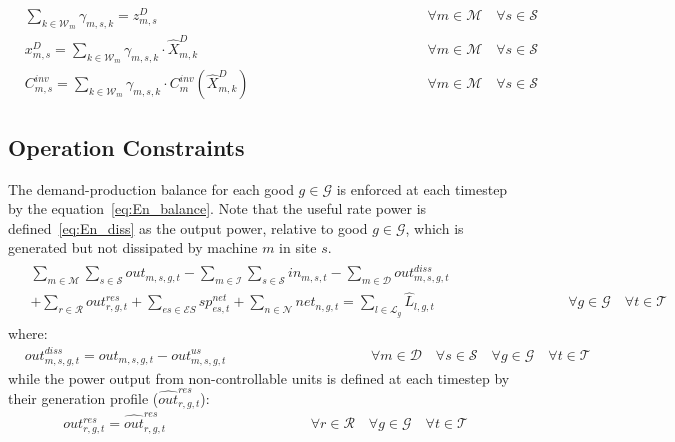 \documentclass{article}
\newcommand{\cT}{{\mathcal T}}
\newcommand{\cM}{{\mathcal M}}
\newcommand{\cI}{{\mathcal I}}
\newcommand{\cD}{{\mathcal D}}
\newcommand{\cS}{{\mathcal S}}
\newcommand{\cR}{{\mathcal R}}
\newcommand{\cES}{{\mathcal ES}}
\newcommand{\cN}{{\mathcal N}}
\newcommand{\cL}{{\mathcal L}}
\newcommand{\cG}{{\mathcal G}}
\newcommand{\cW}{{\mathcal W}}
\begin{document}
{\begin{align}
		& \sum_{k \in \cW_m} \gamma_{m,s,k} = z_{m,s}^D & \hspace{5cm} \forall m \in \cM \quad \forall s \in \cS \label{eq:Active_gamma}\\
		& x_{m,s}^D = \sum_{k \in \cW_m} \gamma_{m,s,k} \cdot \hat{X}_{m,k}^D & \hspace{5cm} \forall m \in \cM \quad \forall s \in \cS \label{eq:Convex_xD}\\
		& C_{m,s}^{inv} = \sum_{k \in \cW_m} \gamma_{m,s,k} \cdot C_{m}^{inv}(\hat{X}_{m,k}^D) & \hspace{5cm} \forall m \in \cM \quad \forall s \in \cS \label{eq:Convex_Cinv}
		\end{align}				

\subsection{Operation Constraints}
The demand-production balance for each good $g \in \cG$ is enforced at each timestep by the equation~\eqref{eq:En_balance}. Note that the useful rate power is defined~\eqref{eq:En_diss} as the output power, relative to good $g \in \cG$, which is generated but not dissipated by machine $m$ in site $s$. 		
		\begin{align}
		\begin{split}
		& \sum_{m \in \cM} \sum_{s \in \cS} out_{m,s,g,t} - \sum_{m \in \cI} \sum_{s \in \cS} in_{m,s,t} - \sum_{m \in \cD} out_{m,s,g,t}^{diss} \\ 
		& + \sum_{r \in \cR} out_{r,g,t}^{res}  + \sum_{es \in \cES} sp_{es,t}^{net} + \sum_{n \in \cN} net_{n,g,t} = \sum_{l \in \cL_g} \hat{L}_{l,g,t}  \hspace{4cm} \forall g \in \cG \quad \forall t \in \cT \label{eq:En_balance}
		\end{split}		
		\end{align}
		where:
		\begin{align}
		& out_{m,s,g,t}^{diss} = out_{m,s,g,t}  - out_{m,s,g,t}^{us} & \hspace{4cm} \forall m \in \cD \quad \forall s \in \cS \quad \forall g \in \cG \quad \forall t \in \cT \label{eq:En_diss}
		\end{align}
		while the power output from non-controllable units is defined at each timestep by their generation profile ($\hat{out}_{r,g,t}^{res}$):
		\begin{align}
		& out_{r,g,t}^{res} = \hat{out}_{r,g,t}^{res}& \hspace{4cm} \forall r \in \cR \quad \forall g \in \cG \quad \forall t \in \cT \label{eq:En_res}

\end{align}}
\end{document}
